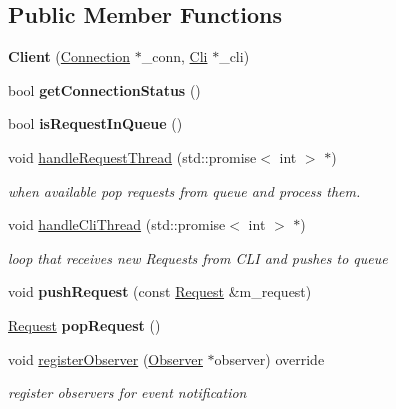 \subsection*{Public Member Functions}
\begin{DoxyCompactItemize}
\item 
\mbox{\label{classClient_aad19bdc87dfe5b5dcb158dc81772480f}} 
{\bfseries Client} (\hyperlink{classConnection}{Connection} $\ast$\+\_\+conn, \hyperlink{classCli}{Cli} $\ast$\+\_\+cli)
\item 
\mbox{\label{classClient_a7dc2cac18cbe25ba37a59599276616f6}} 
bool {\bfseries get\+Connection\+Status} ()
\item 
\mbox{\label{classClient_a3fd906f1fadb1e2e460b3def362ff417}} 
bool {\bfseries is\+Request\+In\+Queue} ()
\item 
void \hyperlink{classClient_a39187196db33ecd252c342fffa7039ef}{handle\+Request\+Thread} (std\+::promise$<$ int $>$ $\ast$)
\begin{DoxyCompactList}\small\item\em when available pop requests from queue and process them. \end{DoxyCompactList}\item 
void \hyperlink{classClient_a8030bdb7d7857907110ad45883b01511}{handle\+Cli\+Thread} (std\+::promise$<$ int $>$ $\ast$)
\begin{DoxyCompactList}\small\item\em loop that receives new Requests from C\+LI and pushes to queue \end{DoxyCompactList}\item 
\mbox{\label{classClient_a84c2ba6a80a727c00e1347749f638d3c}} 
void {\bfseries push\+Request} (const \hyperlink{classRequest}{Request} \&m\+\_\+request)
\item 
\mbox{\label{classClient_af03ddba58ed6f3003e1422e78c00d27c}} 
\hyperlink{classRequest}{Request} {\bfseries pop\+Request} ()
\item 
void \hyperlink{classClient_a1426f0582287f6c583d8681e540059ab}{register\+Observer} (\hyperlink{classObserver}{Observer} $\ast$observer) override
\begin{DoxyCompactList}\small\item\em register observers for event notification \end{DoxyCompactList}\item 

\end{DoxyCompactItemize}
